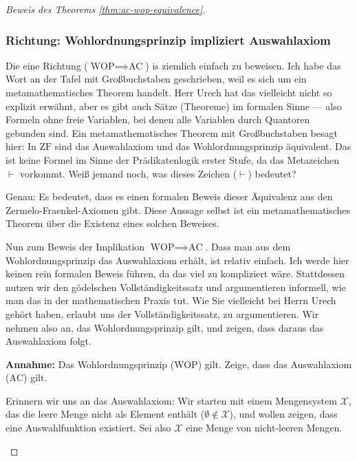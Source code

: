 \begin{proof}[Beweis des Theorems \ref{thm:ac-wop-equivalence}]
\subsubsection{Richtung: Wohlordnungsprinzip impliziert Auswahlaxiom}

\begin{spoken-clean}[00:34:28 - 00:36:58]
Die eine Richtung ($\text{WOP} \implies \text{AC}$) is ziemlich einfach zu beweisen. Ich habe das Wort  an der Tafel mit Großbuchstaben geschrieben, weil es sich um ein metamathematisches Theorem handelt. Herr Urech hat das vielleicht nicht so explizit erwähnt, aber es gibt auch Sätze (Theoreme) im formalen Sinne --- also Formeln ohne freie Variablen, bei denen alle Variablen durch Quantoren gebunden sind. Ein metamathematisches Theorem mit Großbuchstaben besagt hier: In $\text{ZF}$ sind das Auswahlaxiom und das Wohlordnungsprinzip äquivalent. Das ist keine Formel im Sinne der Prädikatenlogik erster Stufe, da das Metazeichen $\vdash$ vorkommt. Weiß jemand noch, was dieses Zeichen ($\vdash$) bedeutet?

Genau: Es bedeutet, dass es einen formalen Beweis dieser Äquivalenz aus den Zermelo-Fraenkel-Axiomen gibt. Diese Aussage selbst ist ein metamathematisches Theorem über die Existenz eines solchen Beweises.

Nun zum Beweis der Implikation $\text{WOP} \implies \text{AC}$. Dass man aus dem Wohlordnungsprinzip das Auswahlaxiom erhält, ist relativ einfach. Ich werde hier keinen rein formalen Beweis führen, da das viel zu kompliziert wäre. Stattdessen nutzen wir den gödelschen Vollständigkeitssatz und argumentieren informell, wie man das in der mathematischen Praxis tut. Wie Sie vielleicht bei Herrn Urech gehört haben, erlaubt uns der Vollständigkeitssatz,  zu argumentieren. Wir nehmen also an, das Wohlordnungsprinzip gilt, und zeigen, dass daraus das Auswahlaxiom folgt.
\end{spoken-clean}

\begin{math-stroke}
\textbf{Annahme:} Das Wohlordnungsprinzip (WOP) gilt. Zeige, dass das Auswahlaxiom ($\text{AC}$) gilt.
\end{math-stroke}

\begin{spoken-clean}[00:36:58 - 00:38:08]
Erinnern wir uns an das Auswahlaxiom: Wir starten mit einem Mengensystem $\mathcal{X}$, das die leere Menge nicht als Element enthält ($\emptyset \notin \mathcal{X}$), und wollen zeigen, dass eine Auswahlfunktion existiert. Sei also $\mathcal{X}$ eine Menge von nicht-leeren Mengen.


\end{spoken-clean}
\end{proof}
